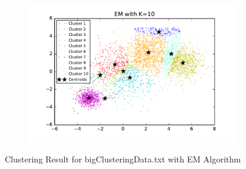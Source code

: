 \begin{figure}[htb]
\begin{subfigure}[b]{0.475\textwidth}
            \includegraphics[width=\textwidth]{./figures/bigClustering_EM_10.pdf}
        \end{subfigure}
        
        \caption{Clustering Result for bigClusteringData.txt with EM Algorithm}
        \label{fig:kmean_clustering}
\end{figure}

